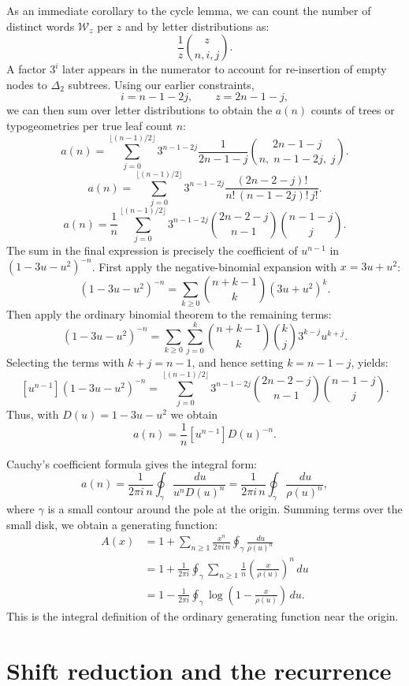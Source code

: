 \documentclass[11pt,fleqn]{article}
\theoremstyle{plain}
\newcommand{\dd}{\,d}
\begin{document}
	As an immediate corollary to the cycle lemma, we can count the number of 
	distinct words $\mathcal{W}_z$ per $z$ and by letter distributions as: 
	\[
	\frac{1}{z}\binom{z}{n,i,j}.
	\]
	A factor $3^i$ later appears in the numerator to account for re-insertion 
	of empty nodes to $\Delta_2$ subtrees. Using our earlier constraints,
	\[
	i=n-1-2j,
	\qquad
	z=2n-1-j,
	\]
	we can then sum over letter distributions to obtain the $a(n)$ counts of 
	trees or typogeometries per true leaf count $n$:
	\[
	a(n) =
	\sum_{j=0}^{\lfloor(n-1)/2\rfloor}
	3^{n-1-2j} \frac{1}{2n-1-j}
	\binom{2n-1-j}{n,\;n-1-2j,\;j}.
	\]
	\[
	a(n) =
	\sum_{j=0}^{\lfloor(n-1)/2\rfloor}
	3^{n-1-2j}\frac{(2n-2-j)!}
	{n!\,(n-1-2j)!\,j!}.
	\]
	\[
	a(n)=\frac1n\sum_{j=0}^{\lfloor(n-1)/2\rfloor}
	3^{n-1-2j}
	\binom{2n-2-j}{n-1}
	\binom{n-1-j}{j}.
	\]
	The sum in the final expression is precisely the coefficient of
	$u^{n-1}$ in $(1-3u-u^2)^{-n}$. First apply the negative-binomial
	expansion with $x=3u+u^2$:
	\[
	(1-3u-u^2)^{-n}
	=
	\sum_{k\geq 0}
	\binom{n+k-1}{k}(3u+u^2)^k.
	\]
	Then apply the ordinary binomial theorem to the remaining terms:
	\[
	(1-3u-u^2)^{-n}
	=
	\sum_{k\geq 0}\sum_{j=0}^{k}
	\binom{n+k-1}{k}
	\binom{k}{j}
	3^{k-j}u^{k+j}.
	\]
	Selecting the terms with $k+j=n-1$, and hence setting
	$k=n-1-j$, yields:
	\[
	[u^{n-1}](1-3u-u^2)^{-n}
	=
	\sum_{j=0}^{\lfloor(n-1)/2\rfloor}
	3^{n-1-2j}
	\binom{2n-2-j}{n-1}
	\binom{n-1-j}{j}.
	\]
	Thus, with $D(u)=1-3u-u^2$ we obtain
	\[
	a(n)=\frac1n[u^{n-1}]D(u)^{-n}.
	\]
	
	Cauchy's coefficient formula gives the integral form:
	\[
	a(n)=\frac{1}{2\pi i\,n}\oint_\gamma
	\frac{\dd u}{u^nD(u)^n}
	=\frac{1}{2\pi i\,n}\oint_\gamma\frac{\dd u}{\rho(u)^n},
	\]
	where $\gamma$ is a small contour around the pole at the origin. 
	Summing terms over the small disk, we obtain a generating function:
	\[
	\begin{aligned}
		A(x)
		&=1+\sum_{n\ge1}\frac{x^n}{2\pi i\,n}
		\oint_\gamma\frac{\dd u}{\rho(u)^n}\\
		&=1+\frac{1}{2\pi i}\oint_\gamma
		\sum_{n\ge1}\frac1n\left(\frac{x}{\rho(u)}\right)^n\dd u\\
		&=1-\frac{1}{2\pi i}\oint_\gamma
		\log\!\left(1-\frac{x}{\rho(u)}\right)\dd u.
	\end{aligned}
	\]
	This is the integral definition of the ordinary generating function near the
	origin.
	
	\section{Shift reduction and the recurrence}
	
\end{document}
